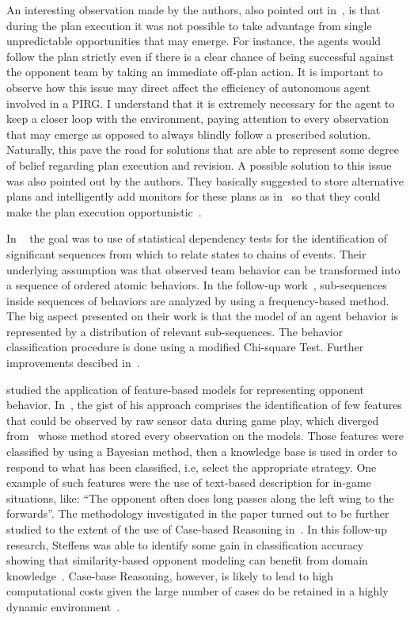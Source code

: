 An interesting observation made by the authors, also pointed out in~\cite{rofer_overview_2012}, is that during the plan execution it was not possible to take advantage from single unpredictable opportunities that may emerge. For instance, the agents would follow the plan strictly even if there is a clear chance of being successful against the opponent team by taking an immediate off-plan action. It is important to observe how this issue may direct affect the efficiency of autonomous agent involved in a PIRG. I understand that it is extremely necessary for the agent to keep a closer loop with the environment, paying attention to every observation that may emerge as opposed to always blindly follow a prescribed solution. Naturally, this pave the road for solutions that are able to represent some degree of belief regarding plan execution and revision. A possible solution to this issue was also pointed out by the authors. They basically suggested to store alternative plans and intelligently add monitors for these plans as in~\cite{veloso_rationale-based_1998} so that they could make the plan execution opportunistic~\cite{riley_coaching_2001,riley_planning_2002,rofer_overview_2012}.

In ~\cite{iglesias_comparing_2006} the goal was to use of statistical dependency tests for the identification of significant sequences from which to relate states to chains of events. Their underlying assumption was that observed team behavior can be transformed into a sequence of ordered atomic behaviors. In the follow-up work~\cite{burgard_classifying_2008}, sub-sequences inside sequences of behaviors are analyzed by using a frequency-based method. The big aspect presented on their work is that the model of an agent behavior is represented by a distribution of relevant sub-sequences. The behavior classification procedure is done using a modified Chi-square Test. Further improvements descibed in~\cite{iglesias_winning_2009}.

\cite{steffens_feature-based_2003, steffens_similarity-based_2005} studied the application of feature-based models for representing opponent behavior. In~\cite{steffens_feature-based_2003}, the gist of his approach comprises the identification of few features that could be observed by raw sensor data during game play, which diverged from~\cite{fix_behavior_2000} whose method stored every observation on the models. Those features were classified by using a Bayesian method, then a knowledge base is used in order to respond to what has been classified, i.e, select the appropriate strategy. One example of such features were the use of text-based description for in-game situations, like: ``The opponent often does long passes along the left wing to the forwards''. The methodology investigated in the paper turned out to be further studied to the extent of the use of Case-based Reasoning in~\cite{steffens_similarity-based_2005}. In this follow-up research, Steffens was able to identify some gain in classification accuracy showing that similarity-based opponent modeling can benefit from domain knowledge~\cite{rofer_overview_2012}. Case-base Reasoning, however, is likely to lead to high computational costs given the large number of cases do be retained in a highly dynamic environment~\cite{ahmadi_using_2004,rofer_overview_2012}.

